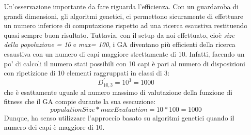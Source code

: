 \documentclass[a4paper, 11pt, oneside]{report}
\begin{document}
            Un'osservazione importante da fare riguarda l'efficienza.
            Con un guardaroba di grandi dimensioni, gli algoritmi genetici,
            ci permettono sicuramente di effettuare un numero inferiore di computazione rispetto ad una ricerca esaustiva
            restituendo quasi sempre buon risultato.
            Tuttavia, con il setup da noi effettuato, cioè \emph{size della popolazione = 10} e
            \emph{max= 100}, i GA diventano più efficienti della ricerca esaustiva con un numero di capi
            maggiore strettamente di 10.
            Infatti, facendo un po' di calcoli il numero stati possibili con 10 capi è pari al numero di disposizioni
            con ripetizione di 10 elementi raggruppati in classi di 3:
            \begin{equation*}
                D_{10,3}^{'}=10^{3}=1000
            \end{equation*}
            che è esattamente uguale al numero massimo di valutazione della funzione di fitness che il GA compie durante la sua esecuzione:
            \begin{equation*}
                populationSize * maxEvaluation = 10 * 100 = 1000
            \end{equation*}
            Dunque, ha senso utilizzare l'approccio basato su algoritmi genetici quando il numero dei capi è maggiore di 10.
\end{document}
